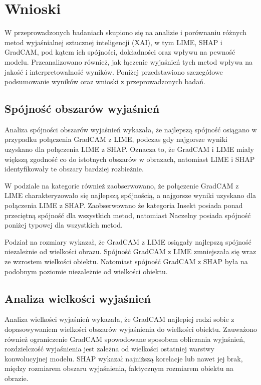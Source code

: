 
\chapter*{Wnioski}

W przeprowadzonych badaniach skupiono się na analizie i porównaniu różnych metod wyjaśnialnej sztucznej inteligencji (XAI), w tym LIME, SHAP i GradCAM, pod kątem ich spójności, dokładności oraz wpływu na pewność modelu.
Przeanalizowano również, jak łączenie wyjaśnień tych metod wpływa na jakość i interpretowalność wyników.
Poniżej przedstawiono szczegółowe podsumowanie wyników oraz wnioski z przeprowadzonych badań.

\section*{Spójność obszarów wyjaśnień}

Analiza spójności obszarów wyjaśnień wykazała, że najlepszą spójność osiągano w przypadku połączenia GradCAM z LIME, podczas gdy najgorsze wyniki uzyskano dla połączenia LIME z SHAP.
Oznacza to, że GradCAM i LIME miały większą zgodność co do istotnych obszarów w obrazach, natomiast LIME i SHAP identyfikowały te obszary bardziej rozbieżnie.

W podziale na kategorie również zaobserwowano, że połączenie GradCAM z LIME charakteryzowało się najlepszą spójnością, a najgorsze wyniki uzyskano dla połączenia LIME z SHAP.
Zaobserwowano że kategoria Insekt posiada ponad przeciętną spójność dla wszystkich metod, natomiast Naczelny posiada spójność poniżej typowej dla wszystkich metod.

Podział na rozmiary wykazał, że GradCAM z LIME osiągały najlepszą spójność niezależnie od wielkości obrazu.
Spójność GradCAM z LIME zmniejszała się wraz ze wzrostem wielkości obiektu.
Natomiast spójność GradCAM z SHAP była na podobnym poziomie niezależnie od wielkości obiektu.

\section*{Analiza wielkości wyjaśnień}

Analiza wielkości wyjaśnień wykazała, że GradCAM najlepiej radzi sobie z dopasowywaniem wielkości obszarów wyjaśnienia do wielkości obiektu.
Zauważono również ograniczenie GradCAM spowodowane sposobem obliczania wyjaśnień, rozdzielczość wyjaśnienia jest zależna od wielkości ostatniej warstwy konwolucyjnej modelu.
SHAP wykazał najniższą korelacje lub nawet jej brak, między rozmiarem obszaru wyjaśnienia, faktycznym rozmiarem obiektu na obrazie.

